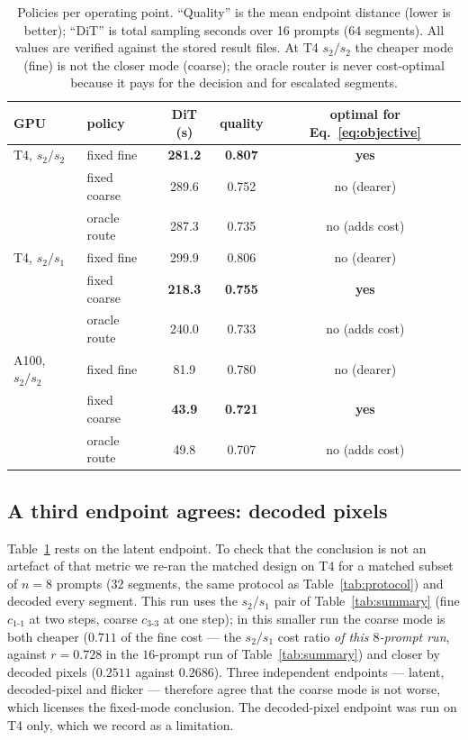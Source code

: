 \documentclass[review]{cas-sc}          %
\begin{document}
\begin{table}
  \centering
  \caption{Policies per operating point. ``Quality'' is the mean endpoint distance (lower is better);
  ``DiT'' is total sampling seconds over 16 prompts (64 segments). All values are verified against the
  stored result files. At T4 $s_2/s_2$ the cheaper mode (fine) is not the closer mode (coarse); the
  oracle router is never cost-optimal because it pays for the decision and for escalated segments.}
  \label{tab:policies}
  \begin{tabular}{llccc}
    \toprule
    GPU & policy & DiT (s) & quality & optimal for Eq.~\eqref{eq:objective} \\
    \midrule
    T4, $s_2/s_2$  & fixed fine   & \textbf{281.2} & \textbf{0.807} & \textbf{yes} \\
                   & fixed coarse & 289.6 & 0.752 & no (dearer) \\
                   & oracle route & 287.3 & 0.735 & no (adds cost) \\
    T4, $s_2/s_1$  & fixed fine   & 299.9 & 0.806 & no (dearer) \\
                   & fixed coarse & \textbf{218.3} & \textbf{0.755} & \textbf{yes} \\
                   & oracle route & 240.0 & 0.733 & no (adds cost) \\
    A100, $s_2/s_2$& fixed fine   & 81.9  & 0.780 & no (dearer) \\
                   & fixed coarse & \textbf{43.9} & \textbf{0.721} & \textbf{yes} \\
                   & oracle route & 49.8  & 0.707 & no (adds cost) \\
    \bottomrule
  \end{tabular}
\end{table}

\subsection{A third endpoint agrees: decoded pixels}
Table~\ref{tab:policies} rests on the latent endpoint. To check that the conclusion is not an artefact of
that metric we re-ran the matched design on T4 for a matched subset of $n = 8$ prompts (32 segments,
the same protocol as Table~\ref{tab:protocol}) and decoded every segment. This run uses the $s_2/s_1$
pair of Table~\ref{tab:summary} (fine $c_{1\text{-}1}$ at two steps, coarse $c_{3\text{-}3}$ at one step);
in this smaller run the coarse mode is both cheaper ($0.711$ of the fine cost --- the $s_2/s_1$ cost
ratio \emph{of this $8$-prompt run}, against $r = 0.728$ in the $16$-prompt run of
Table~\ref{tab:summary}) and closer by decoded pixels ($0.2511$ against $0.2686$). Three independent
endpoints --- latent, decoded-pixel and flicker --- therefore agree that the coarse mode is not worse,
which licenses the fixed-mode conclusion. The decoded-pixel endpoint was run on T4 only, which we record
as a limitation.
\end{document}

